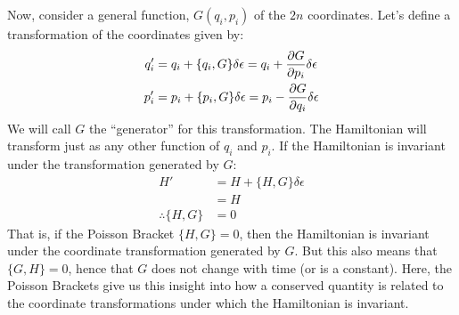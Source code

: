 Now, consider a general function, $G(q_i,p_i)$ of the $2n$ coordinates. Let's define a transformation of the coordinates given by:
\begin{align}
q_i'&=q_i+\{q_i,G\}\delta\epsilon=q_i+\frac{\partial G}{\partial p_i}\delta\epsilon  \nonumber\\
p_i'&=p_i+\{p_i,G\}\delta\epsilon=p_i-\frac{\partial G}{\partial q_i}\delta\epsilon
\end{align}
We will call $G$ the ``generator'' for this transformation. The Hamiltonian will transform just as any other function of $q_i$ and $p_i$. If the Hamiltonian is invariant under the transformation generated by $G$:
\begin{align}
H'&=H+\{H,G\}\delta\epsilon\nonumber\\
&=H \nonumber\\
\therefore \{H,G\}&=0
\end{align}
That is, if the Poisson Bracket $\{H,G\}=0$, then the Hamiltonian is invariant under the coordinate transformation generated by $G$. But this also means that $\{G,H\}=0$, hence that $G$ does not change with time (or is a constant). Here, the Poisson Brackets give us this insight into how a conserved quantity is related to the coordinate transformations under which the Hamiltonian is invariant.